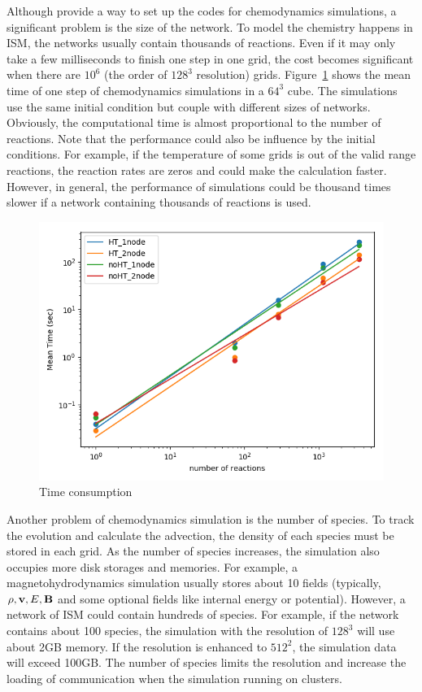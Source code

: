 Although {\KROME} provide a way to set up the codes for chemodynamics simulations, a significant problem is the size of the network. To model the chemistry happens in ISM, the networks usually contain thousands of reactions. Even if it may only take a few milliseconds to finish one step in one grid, the cost becomes significant when there are $10^6$ (the order of $128^3$ resolution) grids. Figure~\ref{fig:timescale} shows the mean time of one step of chemodynamics simulations in a $64^3$ cube. The simulations use the same initial condition but couple with different sizes of networks. Obviously, the computational time is almost proportional to the number of reactions. Note that the performance could also be influence by the initial conditions. For example, if the temperature of some grids is out of the valid range reactions, the reaction rates are zeros and could make the calculation faster. However, in general, the performance of simulations could be thousand times slower if a network containing thousands of reactions is used. 

\begin{figure}
    \centering
    \includegraphics[width=0.8\linewidth]{kappa/images/timesize_all.png}
    \caption{Time consumption}
    \label{fig:timescale}
\end{figure}

Another problem of chemodynamics simulation is the number of species. To track the evolution and calculate the advection, the density of each species must be stored in each grid. As the number of species increases, the simulation also occupies more disk storages and memories. For example, a magnetohydrodynamics simulation usually stores about 10 fields (typically, $\rho, {\bf v}, E, {\bf B}$ and some optional fields like internal energy or potential). However, a network of ISM could contain hundreds of species. For example, if the network contains about 100 species, the simulation with the resolution of $128^3$ will use about 2GB memory. If the resolution is enhanced to $512^2$, the simulation data will exceed 100GB. The number of species limits the resolution and increase the loading of communication when the simulation running on clusters.

